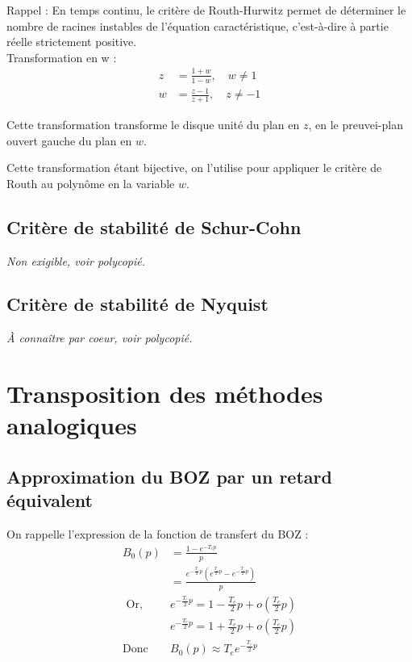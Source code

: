\documentclass[main.tex]{subfiles}
\begin{document}
Rappel : En temps continu, le critère de Routh-Hurwitz permet de déterminer le nombre de racines instables de l'équation caractéristique, c'est-à-dire à partie réelle strictement positive.\\

Transformation en w :
\begin{align*}
z & = \frac{1+w}{1-w} ,\quad w \neq 1 \\
w & = \frac{z-1}{z+1} ,\quad z \neq -1
\end{align*}

Cette transformation transforme le disque unité du plan en $z$, en le preuvei-plan ouvert gauche du plan en $w$.

Cette transformation étant bijective, on l'utilise pour appliquer le critère de Routh au polynôme en la variable $w$.

\subsection*{Critère de stabilité de Schur-Cohn}
\emph{Non exigible, voir polycopié.}

\subsection*{Critère de stabilité de Nyquist}
\emph{À connaître par coeur, voir polycopié.}
\section{Transposition des méthodes analogiques}

\subsection{Approximation du BOZ par un retard équivalent}

On rappelle l'expression de la fonction de transfert du BOZ :
\begin{align*}
B_0(p) & = \frac{1-e^{-T_ep}}{p} \\
& = \frac{e^{-\frac{T_e}{2}p} ( e^{\frac{T_e}{2}p} - e^{-\frac{T_e}{2}p})}{p} \\
\text{ Or, } & e^{-\frac{T_e}{2}p} = 1 - \frac{T_e}{2}p + o(\frac{T_e}{2}p) \\
& e^{-\frac{T_e}{2}p} = 1 + \frac{T_e}{2}p + o(\frac{T_e}{2}p) \\
\text{Donc } & \boxed{ B_0(p)  \approx T_e e^{-\frac{T_e}{2}p}}
\end{align*}
\end{document}
